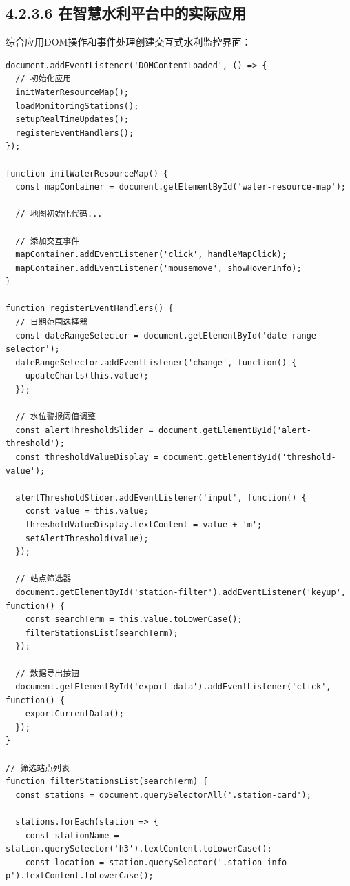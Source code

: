 \subsection{4.2.3.6
在智慧水利平台中的实际应用}\label{ux5728ux667aux6167ux6c34ux5229ux5e73ux53f0ux4e2dux7684ux5b9eux9645ux5e94ux7528}

综合应用DOM操作和事件处理创建交互式水利监控界面：

\begin{lstlisting}
document.addEventListener('DOMContentLoaded', () => {
  // 初始化应用
  initWaterResourceMap();
  loadMonitoringStations();
  setupRealTimeUpdates();
  registerEventHandlers();
});

function initWaterResourceMap() {
  const mapContainer = document.getElementById('water-resource-map');
  
  // 地图初始化代码...
  
  // 添加交互事件
  mapContainer.addEventListener('click', handleMapClick);
  mapContainer.addEventListener('mousemove', showHoverInfo);
}

function registerEventHandlers() {
  // 日期范围选择器
  const dateRangeSelector = document.getElementById('date-range-selector');
  dateRangeSelector.addEventListener('change', function() {
    updateCharts(this.value);
  });
  
  // 水位警报阈值调整
  const alertThresholdSlider = document.getElementById('alert-threshold');
  const thresholdValueDisplay = document.getElementById('threshold-value');
  
  alertThresholdSlider.addEventListener('input', function() {
    const value = this.value;
    thresholdValueDisplay.textContent = value + 'm';
    setAlertThreshold(value);
  });
  
  // 站点筛选器
  document.getElementById('station-filter').addEventListener('keyup', function() {
    const searchTerm = this.value.toLowerCase();
    filterStationsList(searchTerm);
  });
  
  // 数据导出按钮
  document.getElementById('export-data').addEventListener('click', function() {
    exportCurrentData();
  });
}

// 筛选站点列表
function filterStationsList(searchTerm) {
  const stations = document.querySelectorAll('.station-card');
  
  stations.forEach(station => {
    const stationName = station.querySelector('h3').textContent.toLowerCase();
    const location = station.querySelector('.station-info p').textContent.toLowerCase();
    

\end{lstlisting}
